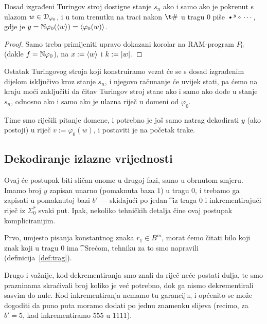 \begin{korolar}\label{kor:faza3}
Dosad izgrađeni Turingov stroj dostigne stanje $s_n$ ako i samo ako je pokrenut s ulazom $w\in\mathcal D_{\varphi_0}$, i u tom trenutku na traci nakon $\t\#$ u tragu $0$ piše $\textup\textbullet^y\textup\textopenbullet\dotsm$, gdje je $y={\mathbb N}\varphi_0(\langle w\rangle)=\langle\varphi_0(w)\rangle$.
\end{korolar}
\begin{proof}
Samo treba primijeniti upravo dokazani korolar na RAM-program $P_0$ (dakle $f={\mathbb N}\varphi_0$), na $x:=\langle w\rangle$ i $k:=\lvert w\rvert$. %
\end{proof}

\begin{napomena}\label{nap:snstane}
Ostatak Turingovog stroja koji konstruiramo vezat će se s dosad izgrađenim dijelom isključivo kroz stanje $s_n$, i njegovo računanje će uvijek stati, pa ćemo na kraju moći zaključiti da čitav Turingov stroj stane ako i samo ako dođe u stanje $s_n$, odnosno ako i samo ako je ulazna riječ u domeni od $\varphi_0$.
\end{napomena}

Time smo riješili pitanje domene, i potrebno je još samo natrag dekodirati $y$ (ako postoji) u riječ $v:=\varphi_0(w)$, i postaviti je na početak trake.

\subsection{Dekodiranje izlazne vrijednosti}

Ovaj će postupak biti sličan onome u drugoj fazi, samo u obrnutom smjeru. Imamo broj $y$ zapisan unarno (pomaknuta baza $1$) u tragu $0$, i trebamo ga zapisati u pomaknutoj bazi $b'$ --- skidajući po jedan \t\textbullet\ iz traga $0$ i inkrementirajući riječ iz $\Sigma_0^*$ svaki put. Ipak, nekoliko tehničkih detalja čine ovaj postupak kompliciranijim.

Prvo, umjesto pisanja konstantnog znaka $r_1\in B^m$, morat ćemo čitati bilo koji znak koji u tragu $0$ ima \t\textbullet. Srećom, tehniku za to smo napravili (definicija~\ref{def:trag}).

Drugo i važnije, kod dekrementiranja smo znali da riječ neće postati dulja, te smo prazninama skraćivali broj koliko je već potrebno, dok ga nismo dekrementirali sasvim do nule. Kod inkrementiranja nemamo tu garanciju, i općenito se može dogoditi da puno puta moramo dodati po jednu znamenku slijeva (recimo, za $b'=5$, kad inkrementiramo $555$ u $1111$).

